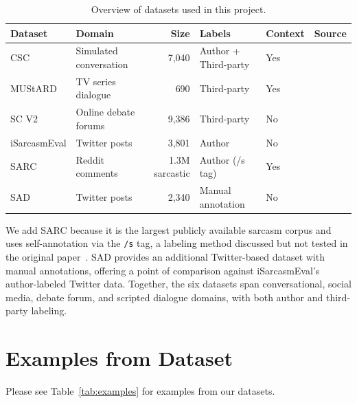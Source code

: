 \documentclass[sigconf, nonacm]{acmart}
\begin{document}
\begin{table}[t]
\centering
\caption{Overview of datasets used in this project.}
\label{tab:datasets}
\begin{tabular}{llrlll}
\toprule
\textbf{Dataset} & \textbf{Domain} & \textbf{Size} &
\textbf{Labels} & \textbf{Context} & \textbf{Source} \\
\midrule
CSC & Simulated conversation & 7,040 & Author + Third-party &
Yes & \cite{jang2024generalizablesarcasmdetectionjust} \\
MUStARD & TV series dialogue & 690 & Third-party &
Yes & \cite{mustard} \\
SC V2 & Online debate forums & 9,386 & Third-party &
No & \cite{sarcasmcorpusv2} \\
iSarcasmEval & Twitter posts & 3,801 & Author &
No & \cite{isarcasmeval} \\
\midrule
SARC & Reddit comments & 1.3M sarcastic & Author (/s tag) &
Yes & \cite{khodak2018largeselfannotatedcorpussarcasm} \\
SAD & Twitter posts & 2,340 & Manual annotation &
No & \cite{painter2022sad} \\
\bottomrule
\end{tabular}
\end{table}

We add SARC because it is the largest publicly available sarcasm corpus and uses self-annotation via the \texttt{/s} tag, a labeling method discussed but not tested in the original paper~\cite{khodak2018largeselfannotatedcorpussarcasm}. SAD provides an additional Twitter-based dataset with manual annotations, offering a point of comparison against iSarcasmEval's author-labeled Twitter data. Together, the six datasets span conversational, social media, debate forum, and scripted dialogue domains, with both author and third-party labeling.

\section{Examples from Dataset}

Please see Table~\ref{tab:examples} for examples from our datasets.
\end{document}
